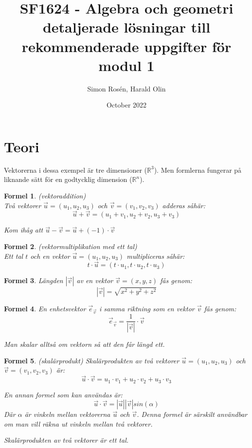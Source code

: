 \documentclass{article}
\title{SF1624 - Algebra och geometri\\ {\large detaljerade lösningar till rekommenderade uppgifter för modul 1}}
\author{Simon Rosén, Harald Olin}
\date{October 2022}
\newtheorem{formel}{Formel}
\newcommand{\Rn}[1]{\mathbb{R}^{#1}}
\begin{document}
\maketitle
\section{Teori}

Vektorerna i dessa exempel är tre dimensioner ($\Rn{3}$). Men formlerna fungerar på liknande sätt för en godtycklig dimension ($\Rn{n}$).

\begin{formel}{(vektoraddition)}\\
\label{vecadd}
Två vektorer $\vec{u} = (u_1, u_2, u_3)$ och $\vec{v} = (v_1, v_2, v_3)$ adderas såhär:
\[
\vec{u} + \vec{v} = (u_1 + v_1, u_2 + v_2, u_3 + v_3)
\]

Kom ihåg att $\vec{u} - \vec{v} = \vec{u} + (-1)\cdot\vec{v}$
\end{formel}

\begin{formel}{(vektormultiplikation med ett tal)}\\
\label{vecscale}
Ett tal $t$ och en vektor $\vec{u} = (u_1, u_2, u_3)$ multipliceras såhär:
\[
t \cdot \vec{u} = (t \cdot u_1, t \cdot u_2, t \cdot u_3)
\]
\end{formel}


\begin{formel}
\label{veclength}
Längden $|\vec{v}|$ av en vektor $\vec{v} = (x, y, z)$ fås genom:
\[
|\vec{v}| = \sqrt{x^2+y^2+z^2}
\]

\end{formel}

\begin{formel}
\label{unitvec}
En enhetsvektor $\vec{e}_\vec{v}$ i samma riktning som en vektor $\vec{v}$ fås genom:
\[
    \vec{e}_{\vec{v}} = \frac{1}{|\vec{v}|} \cdot \vec{v} 
\]

Man skalar alltså om vektorn så att den får längd ett.
\end{formel}

\begin{formel}{(skalärprodukt)}
\label{skalarprod}
Skalärprodukten av två vektorer $\vec{u} = (u_1, u_2, u_3)$ och $\vec{v} = (v_1, v_2, v_3)$ är:
\[
\vec{u} \cdot \vec{v} = u_1 \cdot v_1 + u_2 \cdot v_2 + u_3 \cdot v_3
\]

En annan formel som kan användas är: 
\[
\vec{u} \cdot \vec{v} = |\vec{u}||\vec{v}|sin(\alpha)
\]
Där $\alpha$ är vinkeln mellan vektorerna $\vec{u}$ och $\vec{v}$. Denna formel är särskilt användbar om man vill räkna ut vinkeln mellan två vektorer.

Skalärprodukten av två vektorer är ett tal.
\end{formel}
\end{document}
